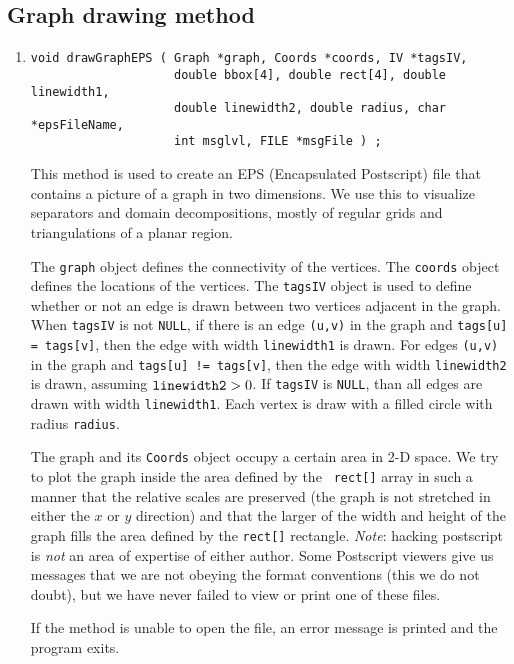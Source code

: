 \subsection{Graph drawing method}
\par
\begin{enumerate}
\item
\begin{verbatim}
void drawGraphEPS ( Graph *graph, Coords *coords, IV *tagsIV, 
                    double bbox[4], double rect[4], double linewidth1,
                    double linewidth2, double radius, char *epsFileName,
                    int msglvl, FILE *msgFile ) ;
\end{verbatim}
This method is used to create an EPS (Encapsulated Postscript) file
that contains a picture of a graph in two dimensions.
We use this to visualize separators and domain decompositions,
mostly of regular grids and triangulations of a planar region.
\par
The {\tt graph} object defines the connectivity of the
vertices.
The {\tt coords} object defines the locations of the vertices.
The {\tt tagsIV} object is used to define whether or not an edge
is drawn between two vertices adjacent in the graph.
When {\tt tagsIV} is not {\tt NULL}, 
if there is an edge {\tt (u,v)} in the graph and 
{\tt tags[u] = tags[v]}, then the edge with width {\tt linewidth1}
is drawn.
For edges {\tt (u,v)} in the graph and 
{\tt tags[u] != tags[v]}, then the edge with width {\tt linewidth2}
is drawn, assuming ${\tt linewidth2} > 0$.
If {\tt tagsIV} is {\tt NULL}, than all edges are drawn with 
width {\tt linewidth1}.
Each vertex is draw with a filled circle with radius {\tt radius}.
\par
The graph and its {\tt Coords} object occupy a certain area in 2-D
space.
We try to plot the graph inside the area defined by the {\tt
rect[]} array in such a manner that the relative scales are
preserved (the graph is not stretched in either the $x$ or $y$
direction) and that the larger of the width and height of the graph
fills the area defined by the {\tt rect[]} rectangle.
{\it Note}: hacking postscript is {\it not} an area of expertise of
either author.
Some Postscript viewers give us messages that we are not obeying
the format conventions (this we do not doubt), but we have never
failed to view or print one of these files.
\par {}
If the method is unable to open the file, 
an error message is printed and the program exits.
\end{enumerate}
\par
